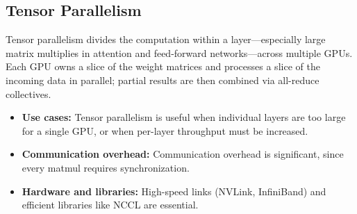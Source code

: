 \subsection{Tensor Parallelism}
\label{sec:scaling-tensor-parallelism}
Tensor parallelism divides the computation within a layer---especially large matrix multiplies in attention and feed-forward networks---across multiple GPUs. Each GPU owns a slice of the weight matrices and processes a slice of the incoming data in parallel; partial results are then combined via all-reduce collectives.

\begin{tcolorbox}[
  title={\textbf{Tensor Parallelism: Key Considerations}},
  colback=blue!5,
  colframe=blue!40!black,
  colbacktitle=blue!20,
  coltitle=black,
  fonttitle=\bfseries,
  boxrule=0.7pt,
  arc=4pt,
  left=5mm, right=5mm, top=4mm, bottom=4mm,
  before skip=6pt,
  after skip=6pt
]
\begin{itemize}[leftmargin=1.5em, itemsep=4pt]
  \item \textbf{Use cases:} Tensor parallelism is useful when individual layers are too large for a single GPU, or when per-layer throughput must be increased.
  
  \item \textbf{Communication overhead:} Communication overhead is significant, since every matmul requires synchronization.
  
  \item \textbf{Hardware and libraries:} High-speed links (NVLink, InfiniBand) and efficient libraries like NCCL are essential.
\end{itemize}
\end{tcolorbox}


